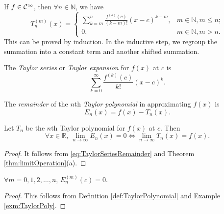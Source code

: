  \begin{exm}
   \label{exm:TaylorPoly}
  If $f\in {\cal C}^{\infty}$, then $\forall n\in\mathbb{N}$,
   we have
  \begin{equation*}
    T_n^{(m)}(x) = \left\{
    \begin{array}{ll}
      \sum_{k=m}^n\frac{f^{(k)}(c)}{(k-m)!}(x-c)^{k-m}, &
      m\in\mathbb{N}, m\le n;
      \\
      0, & m\in\mathbb{N}, m> n.
    \end{array}
    \right.
  \end{equation*}
This can be proved by induction.
In the inductive step, we regroup the summation
 into a constant term and another shifted summation.
\end{exm}

\begin{defn}
  \label{def:TaylorSeries}
The \emph{Taylor series} or \emph{Taylor expansion} 
   for $f(x)$ at $c$ is
 \begin{equation}
     \label{eq:TaylorSeries}
     \sum_{k=0}^{\infty}\frac{f^{(k)}(c)}{k!}(x-c)^k.
   \end{equation}
\end{defn}

\begin{defn}
The \emph{remainder} of the $n$th \emph{Taylor polynomial}
 in approximating $f(x)$ is
  \begin{equation}
    \label{eq:TaylorSeriesRemainder}
    E_n(x) = f(x) - T_n(x).
  \end{equation}
\end{defn}

\begin{thm}
  \label{thm:limitTaylorRemainder}
  Let $T_n$ be the $n$th Taylor polynomial for $f(x)$ at $c$. Then
  \begin{equation}
    \forall x\in \mathbb{R},\
    \lim_{n\rightarrow\infty} E_n(x) = 0
    \iff
    \lim_{n\rightarrow\infty}T_n(x) = f(x).
  \end{equation}
\end{thm}
\begin{proof}
  It follows from \eqref{eq:TaylorSeriesRemainder}
  and Theorem \ref{thm:limitOperation}(a).
\end{proof}

\begin{lem}
  \label{lem:remainder}
  $\forall m=0,1,2,\ldots,n$, $E_n^{(m)}(c)=0$.
\end{lem}
\begin{proof}
  This follows from Definition \ref{def:TaylorPolynomial}
   and Example \ref{exm:TaylorPoly}.
\end{proof}

